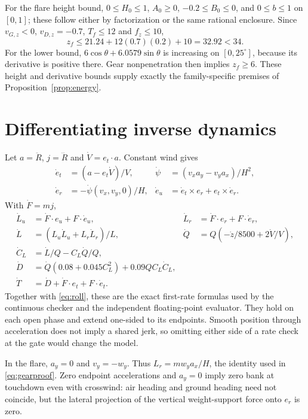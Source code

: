 For the flare height bound, $0\leq H_0\leq1$, $A_0\geq0$, $-0.2\leq B_0\leq0$, and $0\leq b\leq1$ on $[0,1]$; these follow either by factorization or the same rational enclosure. Since $v_{G,z}<0$, $v_{D,z}=-0.7$, $T_f\leq12$ and $f_z\leq10$,
\[
 z_f\leq21.24+12(0.7)(0.2)+10=32.92<34.
\]
For the lower bound, $6\cos\theta+6.0579\sin\theta$ is increasing on $[0,25^\circ]$, because its derivative is positive there. Gear nonpenetration then implies $z_f\geq6$. These height and derivative bounds supply exactly the family-specific premises of Proposition~\ref{prop:energy}.

\section{Differentiating inverse dynamics}\label{app:rates}
Let $a=\ddot R$, $j=\dddot R$ and $\dot V=e_t\cdot a$. Constant wind gives
\begin{align*}
 \dot e_t&=(a-e_t\dot V)/V,&
 \dot\psi&=(v_xa_y-v_ya_x)/H^2,\\
 \dot e_r&=-\dot\psi(v_x,v_y,0)/H,&
 \dot e_u&=\dot e_t\times e_r+e_t\times\dot e_r.
\end{align*}
With $\dot F=mj$,
\begin{align*}
 \dot L_u&=\dot F\cdot e_u+F\cdot\dot e_u,&
 \dot L_r&=\dot F\cdot e_r+F\cdot\dot e_r,\\
 \dot L&=(L_u\dot L_u+L_r\dot L_r)/L,&
 \dot Q&=Q(-\dot z/8500+2\dot V/V),\\
 \dot C_L&=\dot L/Q-C_L\dot Q/Q,&&\\
 \dot D&=\dot Q(0.08+0.045C_L^2)+0.09QC_L\dot C_L,&&\\
 \dot T&=\dot D+\dot F\cdot e_t+F\cdot\dot e_t.&&
\end{align*}
Together with \eqref{eq:roll}, these are the exact first-rate formulas used by the continuous checker and the independent floating-point evaluator. They hold on each open phase and extend one-sided to its endpoints. Smooth position through acceleration does not imply a shared jerk, so omitting either side of a rate check at the gate would change the model.

In the flare, $a_y=0$ and $v_y=-w_y$. Thus $L_r=mw_ya_x/H$, the identity used in \eqref{eq:gearproof}. Zero endpoint accelerations and $a_y=0$ imply zero bank at touchdown even with crosswind: air heading and ground heading need not coincide, but the lateral projection of the vertical weight-support force onto $e_r$ is zero.

